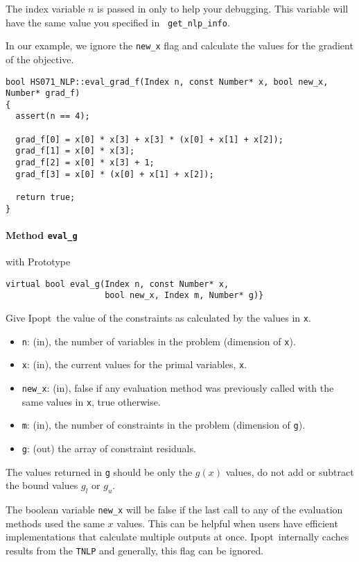 \documentclass[letter,10pt]{article}
\newcommand{\Ipopt}{{\sc Ipopt}}
\begin{document}
The index variable $n$ is passed in only to help your debugging. This
variable will have the same value you specified in {\tt
get\_nlp\_info}.

In our example, we ignore the {\tt new\_x} flag and calculate the
values for the gradient of the objective.
\begin{footnotesize}
\begin{verbatim}
bool HS071_NLP::eval_grad_f(Index n, const Number* x, bool new_x, Number* grad_f)
{
  assert(n == 4);

  grad_f[0] = x[0] * x[3] + x[3] * (x[0] + x[1] + x[2]);
  grad_f[1] = x[0] * x[3];
  grad_f[2] = x[0] * x[3] + 1;
  grad_f[3] = x[0] * (x[0] + x[1] + x[2]);

  return true;
}
\end{verbatim}
\end{footnotesize}

\paragraph{Method {\texttt{eval\_g}}} with Prototype
\begin{verbatim}
virtual bool eval_g(Index n, const Number* x, 
                    bool new_x, Index m, Number* g)}
\end{verbatim}
Give \Ipopt\ the value of the constraints as calculated by the values in {\tt x}.
\begin{itemize}
\item {\tt n}: (in), the number of variables in the problem (dimension of {\tt x}). 
\item {\tt x}: (in), the current values for the primal variables, {\tt x}.
\item {\tt new\_x}: (in), false if any evaluation method was previously called 
        with the same values in {\tt x}, true otherwise.
\item {\tt m}: (in), the number of constraints in the problem (dimension of {\tt g}).
\item {\tt g}: (out) the array of constraint residuals.
\end{itemize}

The values returned in {\tt g} should be only the $g(x)$ values, 
do not add or subtract the bound values $g_l$ or $g_u$.

The boolean variable {\tt new\_x} will be false if the last call to
any of the evaluation methods used the same $x$ values. This can be
helpful when users have efficient implementations that calculate
multiple outputs at once. \Ipopt\ internally caches results from the
{\tt TNLP} and generally, this flag can be ignored.
\end{document}
